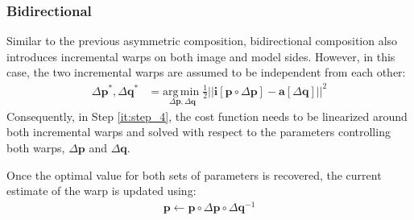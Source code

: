 \subsubsection{Bidirectional}
\label{sec:bidirectional}

Similar to the previous asymmetric composition, bidirectional composition also introduces incremental warps on both image and model sides. However, in this case, the two incremental warps are assumed to be independent from each other:
\begin{equation}
    \begin{aligned}
        \Delta \mathbf{p}^*, \Delta \mathbf{q}^*  & = \underset{\Delta \mathbf{p}, \Delta \mathbf{q}} {\mathrm{arg\, min\;}} \frac{1}{2}|| \mathbf{i}[\mathbf{p}\circ \Delta \mathbf{p}] - \mathbf{a} [\Delta \mathbf{q}] ||^2
    \label{eq:ssd_bc}
    \end{aligned}
\end{equation}
Consequently, in Step \ref{it:step_4}, the cost function needs to be linearized around both incremental warps and solved with respect to the parameters controlling both warps, $\Delta \mathbf{p}$ and $\Delta \mathbf{q}$. 

Once the optimal value for both sets of parameters is recovered, the current estimate of the warp is updated using:
\begin{equation}
 	\begin{aligned}
    	\mathbf{p} \leftarrow \mathbf{p} \circ \Delta \mathbf{p} \circ \Delta {\mathbf{q}}^{-1} 
    \label{eq:bc_update}
    \end{aligned}
\end{equation}
